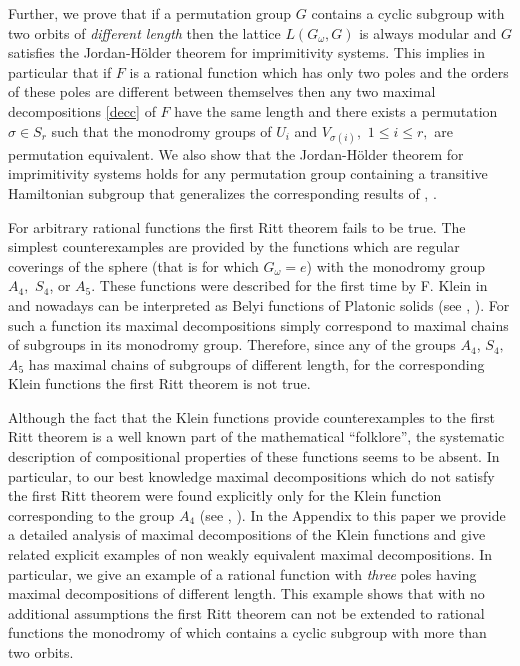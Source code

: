 \documentclass{amsart}
\begin{document}
Further, we prove that if a permutation group $G$
contains a cyclic subgroup with two orbits of {\it different length} then the lattice $L(G_{\omega},G)$ is always modular and $G$ satisfies the Jordan-H{\" o}lder theorem for imprimitivity systems.
This implies in particular that if $F$ is a rational function which has only two poles
and the orders of these poles are different between themselves then any two maximal decompositions \eqref{decc} of $F$ have the same length and
there exists a permutation $\sigma\in S_r$ such that the monodromy groups of $U_i$ and $V_{\sigma(i)},$
$1\leq i \leq r,$ are permutation equivalent. We also show that the Jordan-H{\" o}lder theorem for imprimitivity systems holds for any permutation group containing a transitive
Hamiltonian subgroup that generalizes the corresponding results of \cite{mu}, \cite{mz}.

For arbitrary rational functions the first Ritt theorem fails to be true.
The simplest counterexamples are provided by the functions
which are regular coverings of the sphere (that is for which $G_{\omega}=e$)
with the monodromy group $A_4,$ $S_4$, or $A_5.$ These functions were described for the first time by F. Klein in \cite{klein} and nowadays can be interpreted
as Belyi functions of Platonic solids (see \cite{cg}, \cite{zv}).
For such a function
its maximal decompositions
simply correspond to maximal chains of subgroups in its monodromy group.
Therefore, since any of the groups $A_4$, $S_4,$ $A_5$ has maximal chains of subgroups of different length, for the corresponding
Klein functions the first Ritt theorem is not true.

Although the fact that
the Klein functions
provide counterexamples to the first Ritt theorem
is a well known part of the mathematical ``folklore'', the systematic description of compositional properties of these functions seems to be absent. In particular, to our best knowledge
maximal decompositions
which do not satisfy the first Ritt theorem were found explicitly
only for the Klein function corresponding to the group $A_4$ (see \cite{gs}, \cite{be2}).
In the Appendix to this paper we provide a detailed analysis of maximal decompositions
of the Klein functions and give related explicit examples of non weakly equivalent maximal decompositions. In particular,
we give an example of a rational function with {\it three} poles
having maximal decompositions of different length. This example shows that with no additional
assumptions the first Ritt theorem can not be extended to rational functions the monodromy of which
contains a cyclic subgroup with more than two orbits.
\end{document}
